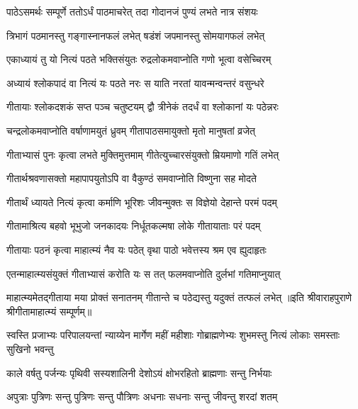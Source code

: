 \twolineshloka
{पाठेऽसमर्थः सम्पूर्णे ततोऽर्धं पाठमाचरेत्}
{तदा गोदानजं पुण्यं लभते नात्र संशयः}%

\twolineshloka
{त्रिभागं पठमानस्तु गङ्गास्नानफलं लभेत्}
{षडंशं जपमानस्तु सोमयागफलं लभेत्}%

\twolineshloka
{एकाध्यायं तु यो नित्यं पठते भक्तिसंयुतः}
{रुद्रलोकमवाप्नोति गणो भूत्वा वसेच्चिरम्}%

\twolineshloka
{अध्यायं श्लोकपादं वा नित्यं यः पठते नरः}
{स याति नरतां यावन्मन्वन्तरं वसुन्धरे}%

\twolineshloka
{गीतायाः श्लोकदशकं सप्त पञ्च चतुष्टयम्}
{द्वौ त्रीनेकं तदर्धं वा श्लोकानां यः पठेन्नरः}%

\twolineshloka
{चन्द्रलोकमवाप्नोति वर्षाणामयुतं ध्रुवम्}
{गीतापाठसमायुक्तो मृतो मानुषतां व्रजेत्}%

\twolineshloka
{गीताभ्यासं पुनः कृत्वा लभते मुक्तिमुत्तमाम्}
{गीतेत्युच्चारसंयुक्तो म्रियमाणो गतिं लभेत्}%

\twolineshloka
{गीतार्थश्रवणासक्तो महापापयुतोऽपि वा}
{वैकुण्ठं समवाप्नोति विष्णुना सह मोदते}%

\twolineshloka
{गीतार्थं ध्यायते नित्यं कृत्वा कर्माणि भूरिशः}
{जीवन्मुक्तः स विज्ञेयो देहान्ते परमं पदम्}%

\twolineshloka
{गीतामाश्रित्य बहवो भूभुजो जनकादयः}
{निर्धूतकल्मषा लोके गीतायाताः परं पदम्}%

\twolineshloka
{गीतायाः पठनं कृत्वा माहात्म्यं नैव यः पठेत्}
{वृथा पाठो भवेत्तस्य श्रम एव ह्युदाहृतः}%

\twolineshloka
{एतन्माहात्म्यसंयुक्तं गीताभ्यासं करोति यः}
{स तत् फलमवाप्नोति दुर्लभां गतिमाप्नुयात्}%

\twolineshloka
{माहात्म्यमेतद्गीताया मया प्रोक्तं सनातनम्}
{गीतान्ते च पठेद्यस्तु यदुक्तं तत्फलं लभेत्}%
{॥इति श्रीवाराहपुराणे श्रीगीतामाहात्म्यं सम्पूर्णम्॥}

\closesub

\resetShloka
{}
\fourlineindentedshloka
{स्वस्ति प्रजाभ्यः परिपालयन्तां}
{न्याय्येन मार्गेण महीं महीशाः}
{गोब्राह्मणेभ्यः शुभमस्तु नित्यं}
{लोकाः समस्ताः सुखिनो भवन्तु}

\twolineshloka
{काले वर्षतु पर्जन्यः पृथिवी सस्यशालिनी}
{देशोऽयं क्षोभरहितो ब्राह्मणाः सन्तु निर्भयाः}

\twolineshloka
{अपुत्राः पुत्रिणः सन्तु पुत्रिणः सन्तु पौत्रिणः}
{अधनाः सधनाः सन्तु जीवन्तु शरदां शतम्}

\resetShloka